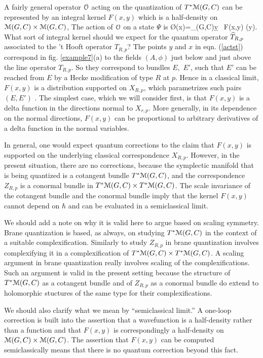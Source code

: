 \documentclass[11pt,a4paper]{article}
\begin{document}
A fairly general operator ${\mathcal O}$ acting on the quantization of $T^*{\mathcal M}(G,C)$ can be represented   by an integral kernel $F(x,y)$ which is a half-density
on ${\mathcal M}(G,C)\times {\mathcal M}(G,C)$,   The action of ${\mathcal O}$ on a state $\Psi$ is
\be\label{actst} \O\Psi(x)=\int_{\M(G,C)}\d y \, F(x,y) \Psi(y). \ee
What sort of integral kernel should we expect for the quantum operator $\widehat T_{R,p}$ associated to the 
't Hooft operator $T_{R,p}$?   The points $y$ and $x$ in eqn. (\ref{actst})  correspond in fig. \ref{example7}(a) to the fields $(A,\phi)$ just below
and just above the line operator $T_{R,p}$.  So they correspond to bundles $E,$ $E'$, such that $E'$ can be reached from $E$ by a Hecke modification of type $R$
at $p$.   Hence in a classical limit, $F(x,y)$ is a distribution supported on $X_{R,p}$, which parametrizes such pairs $(E,E')$ .    The simplest case, which
we will consider first, 
is that $F(x,y)$ is a delta function in the directions normal to $X_{r,p}$.  More generally, in its dependence on the normal directions, $F(x,y)$ can be proportional
to arbitrary derivatives of a delta function in the normal variables.  

In general, one would expect
quantum corrections to the claim that $F(x,y)$ is supported on the underlying classical correspondence $X_{R,p}$.   However, in the present situation, there are no corrections, because the symplectic manifold
that is being quantized is a cotangent bundle $T^*{\mathcal M}(G,C)$, and the correspondence  $Z_{R,p}$ is a conormal bundle in $T^*{\mathcal M}(G,C)\times T^*{\mathcal M}(G,C)$.
The scale invariance of the cotangent bundle and the conormal bundle imply that the kernel $F(x,y)$ cannot depend on $\hbar$ and can be evaluated
in a semiclassical limit. 

We should add a note  on why it is valid here to argue based on scaling symmetry.
Brane quantization is based, as always, on studying $T^*{\mathcal M}(G,C)$ in the context of a suitable complexification.   Similarly to study $Z_{R,p}$ in brane
quantization involves 
complexifying it in a complexification of $T^*{\mathcal M}(G,C)\times T^*{\mathcal M}(G,C)$.
A scaling argument in brane quantization really involves scaling of the complexifications.   Such an argument is valid in the present setting because
the structure of $T^*{\mathcal M}(G,C)$ as a cotangent bundle and of $Z_{R,p}$ as a conormal bundle do extend to holomorphic stuctures of the same
type for their complexifications.    

We should also clarify what we mean by ``semiclassical limit.''  A one-loop correction is built into the assertion that a wavefunction is a half-density rather than a function and that $F(x,y)$ is correspondingly a half-density on ${\mathcal M}(G,C) \times {\mathcal M}(G,C)$.   The assertion that  $F(x,y)$ can be computed semiclassically 
means that there is no quantum correction beyond this fact.
\end{document}
